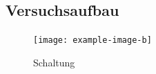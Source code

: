 \documentclass[12pt, a4paper, ngerman]{article}
\begin{document}
\subsection{Versuchsaufbau}

\begin{figure}%
  \centering
  \begin{minipage}[b]{0.49\textwidth}
    \texttt{[image: example-image-b]}
    \caption{Schaltung}
    \label{abb:schaltung3}
  \end{minipage}
\end{figure}
\end{document}

